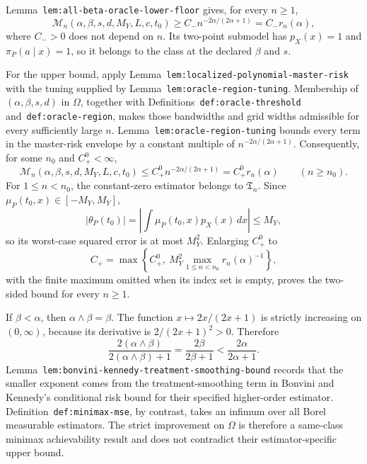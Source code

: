 Lemma~\texttt{lem:all-beta-oracle-lower-floor} gives, for every \(n\ge1\),
\[
\mathcal M_n(\alpha,\beta,s,d,M_Y,L,c,t_0)
\ge C_-n^{-2\alpha/(2\alpha+1)}=C_-r_n(\alpha),
\]
where \(C_->0\) does not depend on \(n\). Its two-point submodel has \(p_X(x)=1\) and \(\pi_P(a\mid x)=1\), so it belongs to the class at the declared \(\beta\) and \(s\).

For the upper bound, apply Lemma~\texttt{lem:localized-polynomial-master-risk} with the tuning supplied by Lemma~\texttt{lem:oracle-region-tuning}. Membership of \((\alpha,\beta,s,d)\) in \(\Omega\), together with Definitions~\texttt{def:oracle-threshold} and~\texttt{def:oracle-region}, makes those bandwidths and grid widths admissible for every sufficiently large \(n\). Lemma~\texttt{lem:oracle-region-tuning} bounds every term in the master-risk envelope by a constant multiple of \(n^{-2\alpha/(2\alpha+1)}\). Consequently, for some \(n_0\) and \(C_+^0<\infty\),
\[
\mathcal M_n(\alpha,\beta,s,d,M_Y,L,c,t_0)
\le C_+^0n^{-2\alpha/(2\alpha+1)}=C_+^0r_n(\alpha)
\qquad(n\ge n_0).
\]
For \(1\le n<n_0\), the constant-zero estimator belongs to \(\mathfrak T_n\). Since \(\mu_P(t_0,x)\in[-M_Y,M_Y]\),
\[
\lvert\theta_P(t_0)\rvert
=\left\lvert\int\mu_P(t_0,x)p_X(x)\,dx\right\rvert\le M_Y,
\]
so its worst-case squared error is at most \(M_Y^2\). Enlarging \(C_+^0\) to
\[
C_+=\max\left\{C_+^0,\ M_Y^2\max_{1\le n<n_0}r_n(\alpha)^{-1}\right\},
\]
with the finite maximum omitted when its index set is empty, proves the two-sided bound for every \(n\ge1\).

If \(\beta<\alpha\), then \(\alpha\wedge\beta=\beta\). The function \(x\mapsto2x/(2x+1)\) is strictly increasing on \((0,\infty)\), because its derivative is \(2/(2x+1)^2>0\). Therefore
\[
\frac{2(\alpha\wedge\beta)}{2(\alpha\wedge\beta)+1}
=\frac{2\beta}{2\beta+1}
<\frac{2\alpha}{2\alpha+1}.
\]
Lemma~\texttt{lem:bonvini-kennedy-treatment-smoothing-bound} records that the smaller exponent comes from the treatment-smoothing term in Bonvini and Kennedy's conditional risk bound for their specified higher-order estimator. Definition~\texttt{def:minimax-mse}, by contrast, takes an infimum over all Borel measurable estimators. The strict improvement on \(\Omega\) is therefore a same-class minimax achievability result and does not contradict their estimator-specific upper bound.